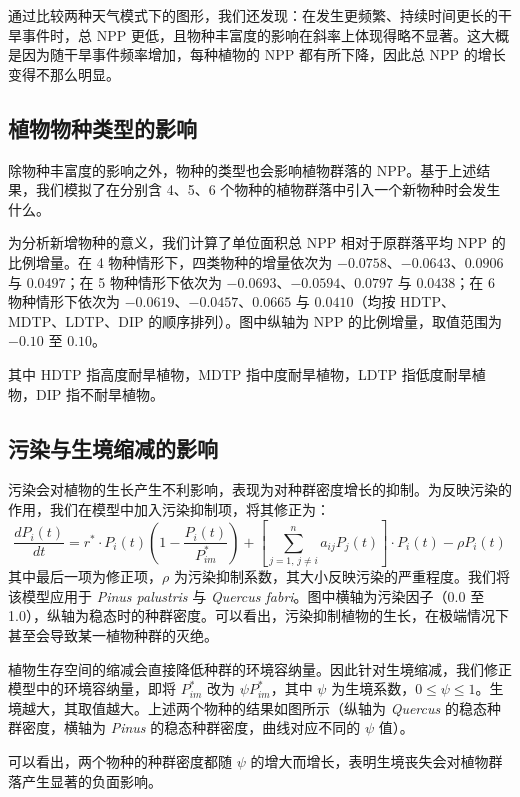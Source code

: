 \documentclass[11pt,a4paper]{ctexart}
\begin{document}
通过比较两种天气模式下的图形，我们还发现：在发生更频繁、持续时间更长的干旱事件时，总 NPP 更低，且物种丰富度的影响在斜率上体现得略不显著。这大概是因为随干旱事件频率增加，每种植物的 NPP 都有所下降，因此总 NPP 的增长变得不那么明显。

\subsection{植物物种类型的影响}

除物种丰富度的影响之外，物种的类型也会影响植物群落的 NPP。基于上述结果，我们模拟了在分别含 4、5、6 个物种的植物群落中引入一个新物种时会发生什么。

为分析新增物种的意义，我们计算了单位面积总 NPP 相对于原群落平均 NPP 的比例增量。在 4 物种情形下，四类物种的增量依次为 $-0.0758$、$-0.0643$、$0.0906$ 与 $0.0497$；在 5 物种情形下依次为 $-0.0693$、$-0.0594$、$0.0797$ 与 $0.0438$；在 6 物种情形下依次为 $-0.0619$、$-0.0457$、$0.0665$ 与 $0.0410$（均按 HDTP、MDTP、LDTP、DIP 的顺序排列）。图中纵轴为 NPP 的比例增量，取值范围为 $-0.10$ 至 $0.10$。

其中 HDTP 指高度耐旱植物，MDTP 指中度耐旱植物，LDTP 指低度耐旱植物，DIP 指不耐旱植物。

\subsection{污染与生境缩减的影响}

污染会对植物的生长产生不利影响，表现为对种群密度增长的抑制。为反映污染的作用，我们在模型中加入污染抑制项，将其修正为：
\begin{equation}
\frac{dP_i(t)}{dt}=r^{*}\cdot P_i(t)\left(1-\frac{P_i(t)}{P_{im}^{*}}\right)+\left[\sum_{j=1,\,j\neq i}^{n}a_{ij}P_j(t)\right]\cdot P_i(t)-\rho P_i(t)
\end{equation}
其中最后一项为修正项，$\rho$ 为污染抑制系数，其大小反映污染的严重程度。我们将该模型应用于 \textit{Pinus palustris} 与 \textit{Quercus fabri}。图中横轴为污染因子（0.0 至 1.0），纵轴为稳态时的种群密度。可以看出，污染抑制植物的生长，在极端情况下甚至会导致某一植物种群的灭绝。

植物生存空间的缩减会直接降低种群的环境容纳量。因此针对生境缩减，我们修正模型中的环境容纳量，即将 $P_{im}^{*}$ 改为 $\psi P_{im}^{*}$，其中 $\psi$ 为生境系数，$0\leq\psi\leq1$。生境越大，其取值越大。上述两个物种的结果如图所示（纵轴为 \textit{Quercus} 的稳态种群密度，横轴为 \textit{Pinus} 的稳态种群密度，曲线对应不同的 $\psi$ 值）。

可以看出，两个物种的种群密度都随 $\psi$ 的增大而增长，表明生境丧失会对植物群落产生显著的负面影响。
\end{document}
